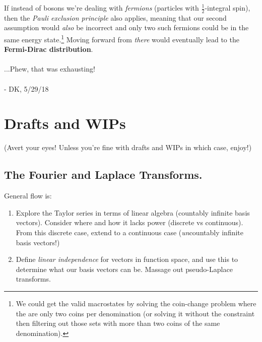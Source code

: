 \documentclass[letterpaper,12pt]{report}
\begin{document}
If instead of bosons we're dealing with \emph{fermions} (particles with
\(\frac{1}{2}\)-integral spin), then the \emph{Pauli exclusion principle} also applies,
meaning that our second assumption would \emph{also} be incorrect and only two such
fermions could be in the same energy state.\footnote{
  We could get the valid macrostates
  by solving the coin-change problem where the are only two coins per denomination
  (or solving it without the constraint then filtering out those sets with more than
  two coins of the same denomination).
}
Moving forward from \emph{there} would
eventually lead to the \textbf{Fermi-Dirac distribution}.
\\
\\
...Phew, that was exhausting!
\\
\\
- DK, 5/29/18


\chapter{Drafts and WIPs}\label{drafts-and-wips}

(Avert your eyes! Unless you're fine with drafts and WIPs \textemdash{} in which case, enjoy!)


\section{The Fourier and Laplace Transforms.}








General flow is:

\begin{enumerate}
  \item
    Explore the Taylor series in terms of linear algebra (countably infinite basis vectors).
    Consider where and how it lacks power (discrete vs continuous).
    From this discrete case, extend to a continuous case
    (\emph{un}countably infinite basis vectors!)
  \item
    Define \emph{linear independence} for vectors in function space, 
    and use this to determine what our basis vectors can be.
    Massage out pseudo-Laplace transforms.

\end{enumerate}
\end{document}
